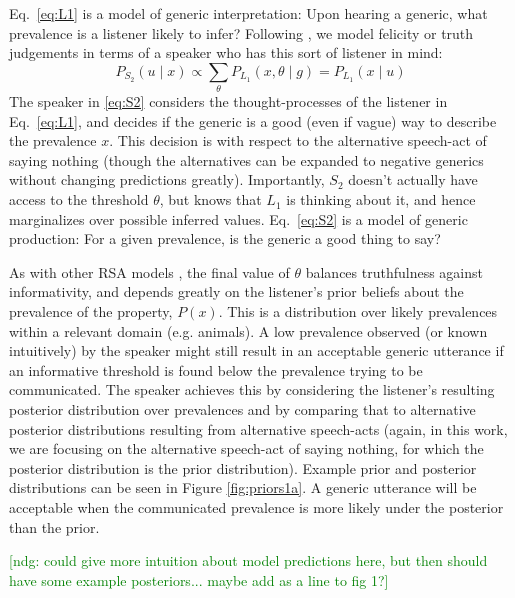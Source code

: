 \documentclass[10pt,letterpaper]{article}
\newcommand{\ndg}[1]{\textcolor{Green}{[ndg: #1]}}
\begin{document}
Eq.~\ref{eq:L1} is a model of generic interpretation: Upon hearing a generic, what prevalence is a listener likely to infer?
Following , we model felicity or truth judgements in terms of a speaker who has this sort of listener in mind:
\begin{equation} 
P_{S_{2}}(u \mid x) \propto  \sum_{\theta} P_{L_{1}}(x , \theta \mid g) =  P_{L_{1}}(x \mid u)
\label{eq:S2}
\end{equation}
%
The speaker in \eqref{eq:S2} considers the thought-processes of the listener in Eq.~\eqref{eq:L1}, and decides if the generic is a good (even if vague) way to describe the prevalence $x$. 
This decision is with respect to the alternative speech-act of saying nothing (though the alternatives can be expanded to negative generics without changing predictions greatly). 
Importantly, $S_{2}$ doesn't actually have access to the threshold $\theta$, but knows that $L_{1}$ is thinking about it, and hence marginalizes over possible inferred values. 
Eq.~\eqref{eq:S2} is a model of generic production: For a given prevalence, is the generic a good thing to say?

As with other RSA models \cite{Lassiter2015}, the final value of $\theta$ balances truthfulness against informativity, and depends greatly on the listener's prior beliefs about the prevalence of the property, $P(x)$.
This is a distribution over likely prevalences within a relevant domain (e.g. animals).
A low prevalence observed (or known intuitively) by the speaker might still result in an acceptable generic utterance if an informative threshold is found below the prevalence trying to be communicated. 
The speaker achieves this by considering the listener's resulting posterior distribution over prevalences and by comparing that to alternative posterior distributions resulting from alternative speech-acts (again, in this work, we are focusing on the alternative speech-act of saying nothing, for which the posterior distribution is the prior distribution). 
Example prior and posterior distributions can be seen in Figure \ref{fig:priors1a}. 
A generic utterance will be acceptable when the communicated prevalence is more likely under the posterior than the prior. 


\ndg{could give more intuition about model predictions here, but then should have some example posteriors... maybe add as a line to fig 1?}
\end{document}
